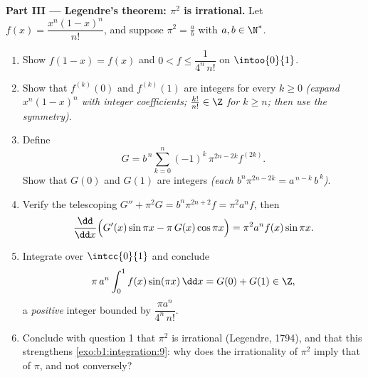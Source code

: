 \begin{problem}
\medskip
\noindent\textbf{Part III --- Legendre's theorem: $\pi^2$ is
irrational.} Let $f(x) = \dfrac{x^n (1 - x)^n}{n!}$, and suppose
$\pi^2 = \frac ab$ with $a, b \in \N^*$.
\begin{enumerate}[resume]
  \item Show $f(1 - x) = f(x)$ and $0 < f \leq
        \dfrac{1}{4^n\,n!}$ on $\intoo{0}{1}$.
  \item Show that $f^{(k)}(0)$ and $f^{(k)}(1)$ are integers for
        every $k \geq 0$ \emph{(expand $x^n(1-x)^n$ with integer
        coefficients; $\frac{k!}{n!} \in \Z$ for $k \geq n$;
        then use the symmetry)}.
  \item Define
        \[
        G = b^{\,n} \sum_{k=0}^{n} (-1)^k\,
        \pi^{2n - 2k} f^{(2k)} .
        \]
        Show that $G(0)$ and $G(1)$ are integers \emph{(each
        $b^n \pi^{2n-2k} = a^{\,n-k}\,b^{\,k}$)}.
  \item Verify the telescoping $G'' + \pi^2 G = b^n \pi^{2n+2} f
        = \pi^2 a^n f$, then
        \[
        \frac{\dd}{\dd x}\Bigl(G'(x)\sin \pi x - \pi\,G(x)\cos
        \pi x\Bigr) = \pi^2 a^n f(x)\sin \pi x .
        \]
  \item Integrate over $\intcc{0}{1}$ and conclude
        \[
        \pi\,a^n \int_0^1 f(x)\sin(\pi x)\,\dd x = G(0) + G(1)
        \in \Z ,
        \]
        a \emph{positive} integer bounded by $\dfrac{\pi
        a^n}{4^n\,n!}$.
  \item Conclude with question 1 that $\pi^2$ is irrational
        (Legendre, 1794), and that this strengthens
        \cref{exo:b1:integration:9}: why does the irrationality
        of $\pi^2$ imply that of $\pi$, and not conversely?
\end{enumerate}


\end{problem}
